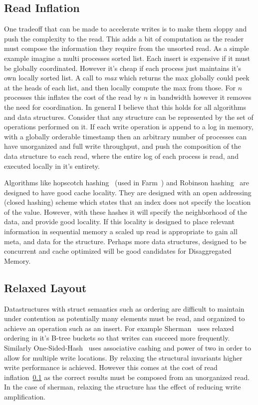 \subsection{Read Inflation} 
\label{sec:readsize}
One tradeoff that can be made to accelerate writes is to make
them sloppy and push the complexity to the read. This adds a bit of computation
as the reader must compose the information they require from the unsorted read.
As a simple example imagine a multi processes sorted list. Each insert is
expensive if it must be globally coordinated. However it's cheap if each process
just maintains it's own locally sorted list. A call to \textit{max} which
returns the max globally could peek at the heads of each list, and then locally
compute the max from those. For $n$ processes this inflates the cost of the read
by $n$ in bandwidth however it removes the need for coordination. In general I
believe that this holds for all algorithms and data structures. Consider that any
structure can be represented by the set of operations performed on it. If each
write operation is append to a log in memory, with a globally orderable
timestamp then an arbitrary number of processes can have unorganized and full
write throughput, and push the composition of the data structure to each read,
where the entire log of each process is read, and executed locally in it's
entirety.

Algorithms like hopscotch hashing~\cite{hopscotch} (used in Farm~\cite{farm})
and Robinson hashing~\cite{robinhood} are designed to have good cache locality.
They are designed with an open addressing (closed hashing) scheme which states
that an index does not specify the location of the value. However, with these
hashes it will specify the neighborhood of the data, and provide good locality.
If this locality is designed to place relevant information in sequential memory
a scaled up read is appropriate to gain all meta, and data for the structure.
Perhaps more data structures, designed to be concurrent and cache optimized will
be good candidates for Disaggregated Memory.

\subsection{Relaxed Layout} Datastructures with struct semantics such as
ordering are difficult to maintain under contention as potentially many elements
must be read, and organized to achieve an operation such as an insert. For
example Sherman~\cite{sherman} uses relaxed ordering in it's B-tree buckets so
that writes can succeed more frequently. Similarly
One-Sided-Hash~\cite{one-sided-hash} uses associative cashing and power of two
in order to allow for multiple write locations. By relaxing the structural
invariants higher write performance is achieved. However this comes at the cost
of read inflation~\ref{sec:readsize} as the correct results must be composed
from an unorganized read. In the case of sherman, relaxing the structure has the
effect of reducing write amplification.


